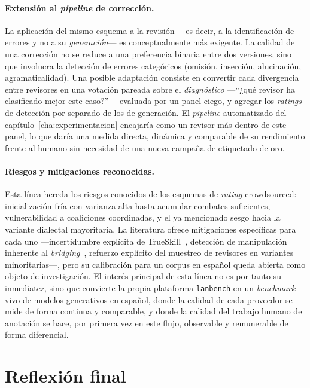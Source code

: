 \paragraph{Extensión al \textit{pipeline} de corrección.} La aplicación
del mismo esquema a la revisión ---es decir, a la identificación de
errores y no a su \emph{generación}--- es conceptualmente más exigente. La
calidad de una corrección no se reduce a una preferencia binaria entre
dos versiones, sino que involucra la detección de errores categóricos
(omisión, inserción, alucinación, agramaticalidad). Una posible
adaptación consiste en convertir cada divergencia entre revisores en una
votación pareada sobre el \emph{diagnóstico} ---``¿qué revisor ha
clasificado mejor este caso?''--- evaluada por un panel ciego, y agregar
los \textit{ratings} de detección por separado de los de generación. El
\textit{pipeline} automatizado del capítulo~\ref{cha:experimentacion}
encajaría como un revisor más dentro de este panel, lo que daría una
medida directa, dinámica y comparable de su rendimiento frente al
humano sin necesidad de una nueva campaña de etiquetado de oro.

\paragraph{Riesgos y mitigaciones reconocidas.} Esta línea hereda los
riesgos conocidos de los esquemas de \textit{rating} crowdsourced:
inicialización fría con varianza alta hasta acumular combates
suficientes, vulnerabilidad a coaliciones coordinadas, y el ya
mencionado sesgo hacia la variante dialectal mayoritaria. La
literatura ofrece mitigaciones específicas para cada uno ---incertidumbre
explícita de TrueSkill~\cite{Herbrich2007_TrueSkill}, detección de
manipulación inherente al \textit{bridging}~\cite{Wojcik2022}, refuerzo
explícito del muestreo de revisores en variantes minoritarias---, pero su
calibración para un corpus en español queda abierta como objeto de
investigación. El interés principal de esta línea no es por tanto su
inmediatez, sino que convierte la propia plataforma \texttt{lanbench}
en un \textit{benchmark} vivo de modelos generativos en español, donde
la calidad de cada proveedor se mide de forma continua y comparable, y
donde la calidad del trabajo humano de anotación se hace, por primera
vez en este flujo, observable y remunerable de forma diferencial.

\section{Reflexión final}

